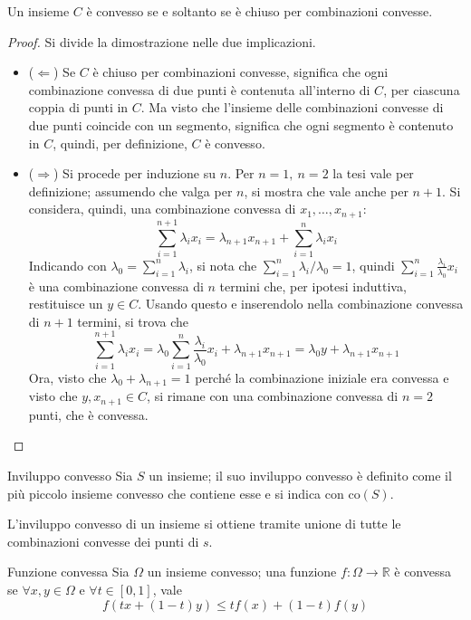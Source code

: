 \documentclass[11pt, a4paper]{scrartcl}
\theoremstyle{definition}
\numberwithin{esempio}{section}
\theoremstyle{definition}
\numberwithin{obs}{section}
\numberwithin{nota}{section}
\numberwithin{equation}{subsection}
\begin{document}
\begin{prop}
	{}{}
	Un insieme $C$ \`e convesso se e soltanto se \`e chiuso per combinazioni convesse.
	\begin{proof}
			Si divide la dimostrazione nelle due implicazioni.
		\begin{itemize}
			\item ($\Leftarrow $) Se $C$ \`e chiuso per combinazioni convesse, significa che ogni combinazione convessa di due punti \`e contenuta all'interno di $C$, per ciascuna coppia di punti in $C$. 
				Ma visto che l'insieme delle combinazioni convesse di due punti coincide con un segmento, significa che ogni segmento \`e contenuto in $C$, quindi, per definizione, $C$ \`e convesso.
			\item ($\Rightarrow $) Si procede per induzione su $n$. Per $n=1, \ n=2$ la tesi vale per definizione; assumendo che valga per $n$, si mostra che vale anche per $n+1$.
				Si considera, quindi, una combinazione convessa di $x_1,\ldots,x_{n+1} $:
				\[
				\sum_{i=1}^{n+1} \lambda _i x_i = \lambda _{n+1} x_{n+1}+ \sum_{i=1}^{n} \lambda _i x_i
				\] 
				Indicando con $\lambda_0 = \sum_{i=1}^{n} \lambda _i$, si nota che $\sum_{i=1}^{n} \lambda _i / \lambda _0 = 1$, quindi $\sum_{i=1}^{n} \frac{\lambda _i}{\lambda _0}x_i$ \`e una combinazione convessa di $n$ termini che, per ipotesi induttiva, restituisce un $y \in C$.
				Usando questo e inserendolo nella combinazione convessa di $n+1$ termini, si trova che
				\[
				\sum_{i=1}^{n+1} \lambda _i x_i = \lambda _0 \sum_{i=1}^{n} \frac{\lambda _i}{\lambda _0} x_i + \lambda _{n+1} x_{n+1} = \lambda _0 y + \lambda _{n+1} x_{n+1} 
				\] 
			Ora, visto che $\lambda _0 + \lambda _{n+1} =1$ perch\'e la combinazione iniziale era convessa e visto che $y,x_{n+1} \in C$, si rimane con una combinazione convessa di $n=2$ punti, che \`e convessa.
		\end{itemize}
	\end{proof}
\end{prop}
\begin{definizione}
	{Inviluppo convesso}{}
	Sia $S$ un insieme; il suo inviluppo convesso \`e definito come il pi\`u piccolo insieme convesso che contiene esse e si indica con $\mathrm{co} (S)$.
\end{definizione}
\noindent L'inviluppo convesso di un insieme si ottiene tramite unione di tutte le combinazioni convesse dei punti di $s$.
\begin{definizione}
	{Funzione convessa}{}
	Sia $\Omega $ un insieme convesso; una funzione $f:\Omega \to \mathbb{R}$ \`e convessa se $\forall x,y \in \Omega $ e $\forall t \in [0,1]$, vale
	\[
	f(tx + (1-t)y)\le tf(x) +(1-t)f(y)
	\] 
\end{definizione}
\end{document}
